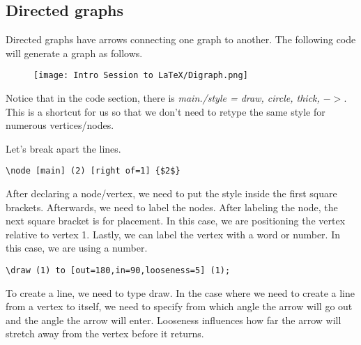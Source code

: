 \documentclass[11pt]{article}
\begin{document}
\subsection{Directed graphs}

Directed graphs have arrows connecting one graph to another. 
The following code will generate a graph as follows.

\vspace{3mm}
\begin{figure}[htbp]
    \centerline{\texttt{[image: Intro Session to LaTeX/Digraph.png]}}
\end{figure}
\vspace{3mm}

\begin{center}
\end{center}

Notice that in the code section, there is \emph{main./style = {draw, circle}, thick, $->$}. This is a shortcut for us so that we don't need to retype the same style for numerous vertices/nodes.
\vspace{3mm}

Let's break apart the lines.
\vspace{3mm}

\verb|\node [main] (2) [right of=1] {$2$}|

\vspace{3mm}
After declaring a node/vertex, we need to put the style inside the first square brackets. Afterwards, we need to label the nodes. After labeling the node, the next square bracket is for placement. In this case, we are positioning the vertex relative to vertex 1. Lastly, we can label the vertex with a word or number. In this case, we are using a number.
\vspace{3mm}

\verb|\draw (1) to [out=180,in=90,looseness=5] (1);|

\vspace{3mm}
To create a line, we need to type draw. In the case where we need to create a line from a vertex to itself, we need to specify from which angle the arrow will go out and the angle the arrow will enter. Looseness influences how far the arrow will stretch away from the vertex before it returns.
\vspace{3mm}
\end{document}
